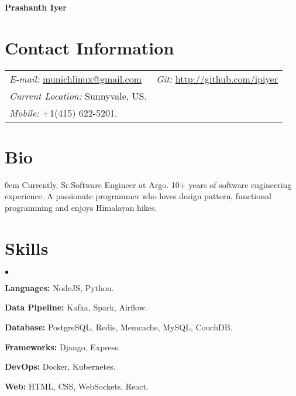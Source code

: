 \documentclass[margin, line, 10pt]{res}
\newenvironment{list2}{
  \begin{list}{$\bullet$}{%
      \setlength{\itemsep}{0in}
      \setlength{\parsep}{0in} \setlength{\parskip}{0in}
      \setlength{\topsep}{0in} \setlength{\partopsep}{0in}
      \setlength{\leftmargin}{0.2in}}}{\end{list}}
\begin{document}
 \textbf{\LARGE Prashanth Iyer}
\vspace{.1cm} \\
\begin{resume}

\section{Contact Information}
\vspace{.05in}
\begin{tabular}{@{}p{3in}p{3in}}
{\it E-mail:} \href{mailto:munichlinux@gmail.com}{munichlinux@gmail.com} & {\it Git:} \href{http://github.com/ipiyer}{http://github.com/ipiyer} \\
{\it Current Location:} Sunnyvale, US. \\
{\it Mobile:}  +1(415) 622-5201.
\end{tabular}

\section{Bio}
\begin{addmargin}{0em}
Currently, Sr.Software Engineer at Argo. 10+ years of software engineering experience. A passionate programmer who loves design pattern, functional programming and enjoys Himalayan hikes.\\
\end{addmargin}
\vspace{-.15in}

\section{Skills}
\begin{list2}
\item {\bf Languages:} NodeJS, Python.\\
  \vspace{-.3cm}
\item {\bf Data Pipeline:} Kafka, Spark, Airflow.\\
  \vspace{-.3cm}
\item {\bf Database:} PostgreSQL, Redis, Memcache, MySQL, CouchDB.\\
  \vspace{-.3cm}
\item {\bf Frameworks:} Django, Express.\\
  \vspace{-.3cm}
\item {\bf DevOps:} Docker, Kubernetes.\\
  \vspace{-.3cm}
\item {\bf Web:} HTML, CSS, WebSockets, React.\\
  \vspace{-.3cm}
\end{list2}


\end{resume}
\end{document}
